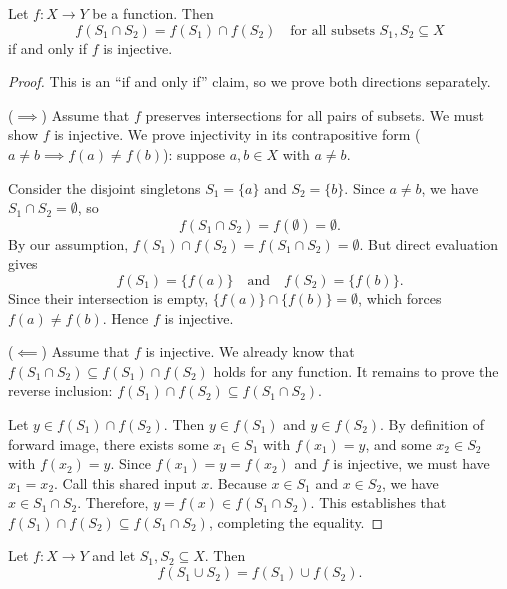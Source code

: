 \begin{theorem}
Let $f: X \to Y$ be a function. Then
\[
f(S_1 \cap S_2) = f(S_1) \cap f(S_2) \quad \text{for all subsets } S_1, S_2 \subseteq X
\]
if and only if $f$ is injective.
\end{theorem}

\begin{proof}
This is an ``if and only if'' claim, so we prove both directions separately.

($\implies$) Assume that $f$ preserves intersections for all pairs of subsets. We must show $f$ is injective. We prove injectivity in its contrapositive form ($a \neq b \implies f(a) \neq f(b)$): suppose $a, b \in X$ with $a \neq b$. 

Consider the disjoint singletons $S_1 = \{a\}$ and $S_2 = \{b\}$. Since $a \neq b$, we have $S_1 \cap S_2 = \emptyset$, so
\[
f(S_1 \cap S_2) = f(\emptyset) = \emptyset.
\]
By our assumption, $f(S_1) \cap f(S_2) = f(S_1 \cap S_2) = \emptyset$. But direct evaluation gives
\[
f(S_1) = \{f(a)\} \quad \text{and} \quad f(S_2) = \{f(b)\}.
\]
Since their intersection is empty, $\{f(a)\} \cap \{f(b)\} = \emptyset$, which forces $f(a) \neq f(b)$. Hence $f$ is injective.

($\impliedby$) Assume that $f$ is injective. We already know that $f(S_1 \cap S_2) \subseteq f(S_1) \cap f(S_2)$ holds for any function. It remains to prove the reverse inclusion: $f(S_1) \cap f(S_2) \subseteq f(S_1 \cap S_2)$.

Let $y \in f(S_1) \cap f(S_2)$. Then $y \in f(S_1)$ and $y \in f(S_2)$.
By definition of forward image, there exists some $x_1 \in S_1$ with $f(x_1) = y$, and some $x_2 \in S_2$ with $f(x_2) = y$.
Since $f(x_1) = y = f(x_2)$ and $f$ is injective, we must have $x_1 = x_2$.
Call this shared input $x$. Because $x \in S_1$ and $x \in S_2$, we have $x \in S_1 \cap S_2$.
Therefore, $y = f(x) \in f(S_1 \cap S_2)$.
This establishes that $f(S_1) \cap f(S_2) \subseteq f(S_1 \cap S_2)$, completing the equality.
\end{proof}

\begin{theorem}
Let $f: X \to Y$ and let $S_1, S_2 \subseteq X$. Then
\[
f(S_1 \cup S_2) = f(S_1) \cup f(S_2).
\]
\end{theorem}

